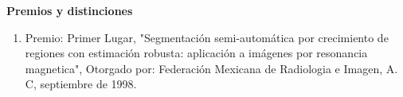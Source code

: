 \textbf{Premios y distinciones}

\begin{enumerate}
\item Premio: Primer Lugar, "Segmentación semi-automática por crecimiento de regiones con estimación robusta: aplicación a 
imágenes por resonancia magnetica", Otorgado por: Federación Mexicana de Radiologia e Imagen, A. C, septiembre de 1998.
\end{enumerate}
